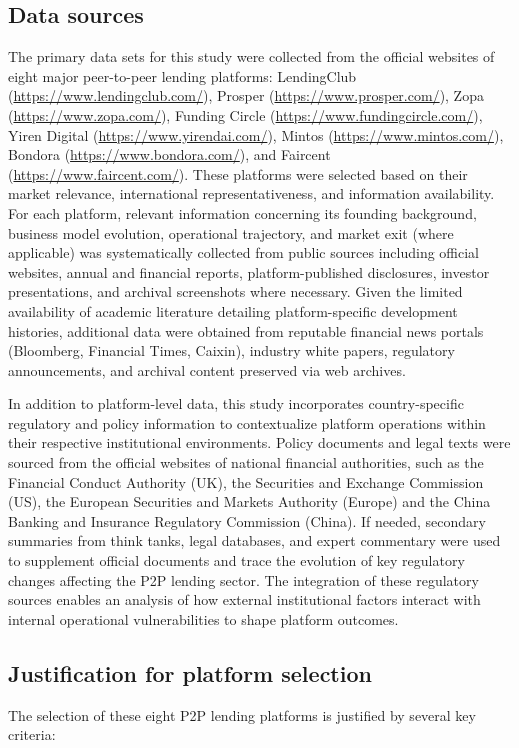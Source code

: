 \documentclass[pdflatex,sn-apa]{sn-jnl}%
\theoremstyle{thmstyleone}%
\theoremstyle{thmstyletwo}%
\theoremstyle{thmstylethree}%
\begin{document}
\subsection{Data sources}
The primary data sets for this study were collected from the official websites of eight major peer-to-peer lending platforms: LendingClub (\url{https://www.lendingclub.com/}), Prosper (\url{https://www.prosper.com/}), Zopa (\url{https://www.zopa.com/}), Funding Circle (\url{https://www.fundingcircle.com/}), Yiren Digital (\url{https://www.yirendai.com/}), Mintos (\url{https://www.mintos.com/}), Bondora (\url{https://www.bondora.com/}), and Faircent (\url{https://www.faircent.com/}). These platforms were selected based on their market relevance, international representativeness, and information availability. For each platform, relevant information concerning its founding background, business model evolution, operational trajectory, and market exit (where applicable) was systematically collected from public sources including official websites, annual and financial reports, platform-published disclosures, investor presentations, and archival screenshots where necessary. Given the limited availability of academic literature detailing platform-specific development histories, additional data were obtained from reputable financial news portals (Bloomberg, Financial Times, Caixin), industry white papers, regulatory announcements, and archival content preserved via web archives.

In addition to platform-level data, this study incorporates country-specific regulatory and policy information to contextualize platform operations within their respective institutional environments. Policy documents and legal texts were sourced from the official websites of national financial authorities, such as the Financial Conduct Authority (UK), the Securities and Exchange Commission (US), the European Securities and Markets Authority (Europe) and the China Banking and Insurance Regulatory Commission (China). If needed, secondary summaries from think tanks, legal databases, and expert commentary were used to supplement official documents and trace the evolution of key regulatory changes affecting the P2P lending sector. The integration of these regulatory sources enables an analysis of how external institutional factors interact with internal operational vulnerabilities to shape platform outcomes.

\subsection{Justification for platform selection}
The selection of these eight P2P lending platforms is justified by several key criteria:
\end{document}

